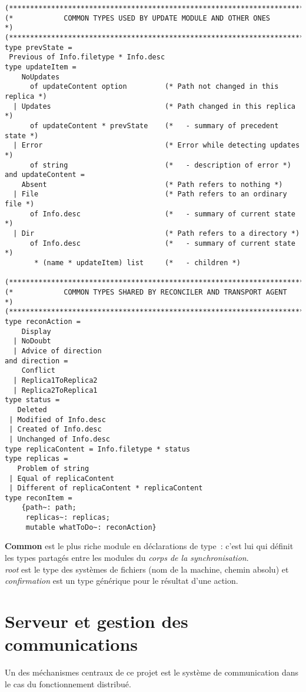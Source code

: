 \documentclass[11pt]{report}
\newcommand{\data}[1]{\emph{#1}}
\newcommand{\modu}[1]{\textbf{#1}}
\begin{document}
{\begin{verbatim}
(***************************************************************************)
(*            COMMON TYPES USED BY UPDATE MODULE AND OTHER ONES            *)
(***************************************************************************)
type prevState = 
 Previous of Info.filetype * Info.desc
type updateItem = 
    NoUpdates 
      of updateContent option         (* Path not changed in this replica *)
  | Updates                           (* Path changed in this replica *)
      of updateContent * prevState    (*   - summary of precedent state *)
  | Error                             (* Error while detecting updates *)
      of string                       (*   - description of error *)
and updateContent =
    Absent                            (* Path refers to nothing *)
  | File                              (* Path refers to an ordinary file *)
      of Info.desc                    (*   - summary of current state *)
  | Dir                               (* Path refers to a directory *)
      of Info.desc                    (*   - summary of current state *)
       * (name * updateItem) list     (*   - children *)

(***************************************************************************)
(*            COMMON TYPES SHARED BY RECONCILER AND TRANSPORT AGENT        *)
(***************************************************************************)
type reconAction =
    Display
  | NoDoubt
  | Advice of direction
and direction =
    Conflict
  | Replica1ToReplica2
  | Replica2ToReplica1
type status = 
   Deleted 
 | Modified of Info.desc
 | Created of Info.desc
 | Unchanged of Info.desc
type replicaContent = Info.filetype * status
type replicas =
   Problem of string
 | Equal of replicaContent
 | Different of replicaContent * replicaContent
type reconItem =
    {path~: path;
     replicas~: replicas;
     mutable whatToDo~: reconAction}
\end{verbatim}
\modu{Common} est le plus riche module en d\'eclarations de type~: 
c'est lui qui d\'efinit les types partag\'es entre les modules du 
\emph{corps de la synchronisation}.\\
\data{root} est le type des syst\`emes de fichiers (nom de la machine, chemin
absolu) et \data{confirmation} est un type g\'en\'erique pour le r\'esultat
d'une action.
\section{Serveur et gestion des communications}
\label{server}
Un des m\'echanismes centraux de ce projet est le syst\`eme de
communication dans le cas du fonctionnement distribu\'e.
}
\end{document}
